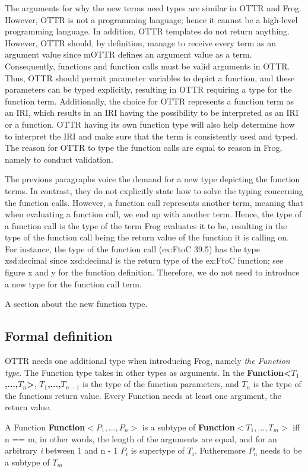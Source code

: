 \para
The arguments for why the new terms need types are similar in OTTR and Frog. However, OTTR is not a programming language; hence it cannot be a high-level programming language. In addition, OTTR templates do not return anything. However, OTTR should, by definition, manage to receive every term as an argument value since mOTTR defines an argument value as a term. Consequently, functions and function calls must be valid arguments in OTTR. Thus, OTTR should permit parameter variables to depict a function, and these parameters can be typed explicitly, resulting in OTTR requiring a type for the function term. Additionally, the choice for OTTR represents a function term as an IRI, which results in an IRI having the possibility to be interpreted as an IRI or a function. OTTR having its own function type will also help determine how to interpret the IRI and make sure that the term is consistently used and typed. The reason for OTTR to type the function calls are equal to reason in Frog, namely to conduct validation. 

\para
The previous paragraphs voice the demand for a new type depicting the function terms. In contrast, they do not explicitly state how to solve the typing concerning the function calls. However, a function call represents another term, meaning that when evaluating a function call, we end up with another term. Hence, the type of a function call is the type of the term Frog evaluates it to be, resulting in the type of the function call being the return value of the function it is calling on. For instance, the type of the function call (ex:FtoC 39.5) has the type xsd:decimal since xsd:decimal is the return type of the ex:FtoC function; see figure x and y for the function definition. Therefore, we do not need to introduce a new type for the function call term.

\para
A section about the new function type.

\subsection{Formal definition}
OTTR needs one additional type when introducing Frog, namely \emph{the Function type}. The Function type takes in other types as arguments. In the \textbf{Function<$T_1$,...,$T_n$>},\textbf{ $T_1$,...,$T_{n - 1}$} is the type of the function parameters, and \textbf{$T_n$} is the type of the functions return value. Every Function needs at least one argument, the return value. 

\para
A Function \textbf{Function$<P_1,...,P_n>$} is a subtype of \textbf{Function$<T_1,...,T_m>$} iff n == m, in other words, the length of the arguments are equal, and for an arbitrary \textit{i} between 1 and n - 1  \textbf{$P_i$} is supertype of \textbf{$T_i$}. Futheremore \textbf{$P_n$} needs to be a subtype of \textbf{$T_m$}

